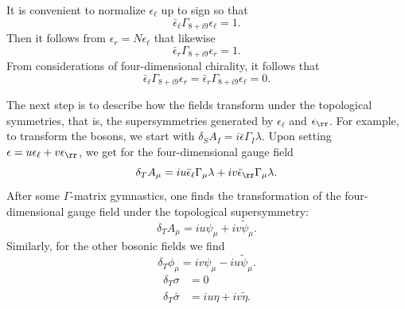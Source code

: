 It is convenient to normalize $\epsilon_\ell$ up to sign so that
\setcounter{equation}{18}
\begin{equation}\label{eq:zomop}
\bar\epsilon_\ell \Gamma_{8+i9}\epsilon_\ell = 1.
\end{equation}
 Then
it follows from $\epsilon_r=N\epsilon_\ell$ that likewise
\setcounter{equation}{19}
\begin{equation}\label{eq:omop}
\bar\epsilon_r\Gamma_{8+i9}\epsilon_r=1.
\end{equation}
 {}From
considerations of four-dimensional chirality, it follows that
\setcounter{equation}{20}
\begin{equation}\label{eq:tomop}
\bar\epsilon_\ell\Gamma_{8+i9}\epsilon_r
=\bar\epsilon_r\Gamma_{8+i9}\epsilon_\ell=0.
\end{equation}

The next step is to describe how the fields transform under the
topological symmetries, that is, the supersymmetries generated by
$\epsilon_\ell$ and $\epsilon_\rr$.   For example, to transform
the bosons, we start with $\delta_S A_I=i\bar\epsilon
\Gamma_I\lambda$. Upon setting $\epsilon =
u\epsilon_\ell+v\epsilon_\rr$, we get for the four-dimensional
gauge field %
\setcounter{equation}{21}
\begin{equation}\label{eq:kono}
\delta_T A_\mu = iu\bar \epsilon_\ell
\Gamma_\mu \lambda +iv\bar\epsilon_\rr\Gamma_\mu\lambda.
\end{equation}
 After
some $\Gamma$-matrix gymnastics, one finds the transformation of
the four-dimensional gauge field under the topological
supersymmetry: %
\setcounter{equation}{22}
\begin{equation}\label{eq:bono}
\delta_T A_\mu=iu
\psi_\mu+iv\tilde\psi_\mu.
\end{equation}
 Similarly, for the other bosonic
fields we find %
\setcounter{equation}{23}
\begin{equation}\label{eq:lono}
\delta_T\phi_\mu=iv\psi_\mu -
iu\tilde\psi_\mu.
\end{equation}
\setcounter{equation}{24}
\begin{equation}\label{eq:otono}
\begin{aligned}\delta_T\sigma & = 0 \\
                       \delta_T\bar\sigma & = iu\eta+iv\tilde\eta.\\\end{aligned}
\end{equation}

